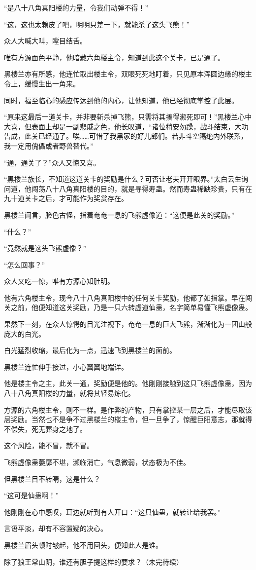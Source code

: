 \begin{this_body}
“是八十八角真阳楼的力量，令我们动弹不得！”

“这，这也太赖皮了吧，明明只差一下，就能杀了这头飞熊！”

众人大喊大叫，瞠目结舌。

唯有方源面色平静，他暗藏六角楼主令，知道到此这个关卡，已是通了。

黑楼兰亦有所感，他连忙取出楼主令，双眼死死地盯着，只见原本浑圆边缘的楼主令上，缓慢生出一角来。

同时，福至临心的感应传达到他的内心，让他知道，他已经彻底掌控了此层。

“原来这最后一道关卡，并非要斩杀掉飞熊，只需将其揍得濒死即可！”黑楼兰心中大喜，但表面上却是一副悲戚之色，他长叹道，“诸位稍安勿躁，战斗结束，大功告成，此关已经通了。唉……可惜了我黑家的好儿郎们。若非斗空隔绝内外联系，我一定用傀儡或者野兽替代。”

“通，通关了？”众人又惊又喜。

“黑楼兰族长，不知道这道关卡的奖励是什么？可否让老夫开开眼界。”太白云生询问道，他闯荡八十八角真阳楼的目的，就是寻得寿蛊。然而寿蛊稀缺珍贵，只有在九十道关卡之后，才可能作为奖赏存在。

黑楼兰闻言，脸色古怪，指着奄奄一息的飞熊虚像道：“这便是此关的奖励。”

“什么？”

“竟然就是这头飞熊虚像？”

“怎么回事？”

众人又吃一惊，唯有方源心知肚明。

他有六角楼主令，现今八十八角真阳楼中的任何关卡奖励，他都了如指掌。早在闯关之前，他便知道这关奖励，乃是一只六转虚道仙蛊，名字简单易懂飞熊虚像蛊。

果然下一刻，在众人惊愕的目光注视下，奄奄一息的巨大飞熊，渐渐化为一团山般庞大的白光。

白光猛烈收缩，最后化为一点，迅速飞到黑楼兰的面前。

黑楼兰连忙伸手接过，小心翼翼地端详。

他是楼主令之主，此关一通，奖励便是他的。他刚刚接触到这只飞熊虚像蛊，因为八十八角真阳楼的力量，就将其轻易炼化。

方源的六角楼主令，则不一样。是作弊的产物，只有掌控某一层之后，才能尽取该层奖励。当然也不是争不过黑楼兰的楼主令，但一旦争了，惊醒巨阳意志，那就得不偿失，死无葬身之地了。

这个风险，能不冒，就不冒。

飞熊虚像蛊萎靡不堪，濒临消亡，气息微弱，状态极为不佳。

但黑楼兰目不转睛，这是什么？

“这可是仙蛊啊！”

他刚刚在心中感叹，耳边就听到有人开口：“这只仙蛊，就转让给我罢。”

言语平淡，却有不容置疑的决心。

黑楼兰眉头顿时皱起，他不用回头，便知此人是谁。

除了狼王常山阴，谁还有胆子提这样的要求？（未完待续）

\end{this_body}

